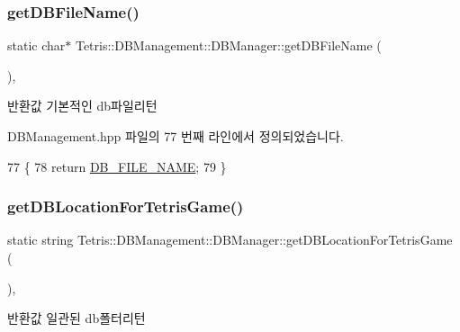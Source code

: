 \subsubsection{\texorpdfstring{get\+D\+B\+File\+Name()}{getDBFileName()}}
{\footnotesize\ttfamily static char$\ast$ Tetris\+::\+D\+B\+Management\+::\+D\+B\+Manager\+::get\+D\+B\+File\+Name (\begin{DoxyParamCaption}{ }\end{DoxyParamCaption})\hspace{0.3cm}{\ttfamily [inline]}, {\ttfamily [static]}}

\begin{DoxyReturn}{반환값}
기본적인 db파일리턴 
\end{DoxyReturn}


D\+B\+Management.\+hpp 파일의 77 번째 라인에서 정의되었습니다.


\begin{DoxyCode}
77                                         \{
78                 \textcolor{keywordflow}{return} \hyperlink{_base_d_b_management_8hpp_a028e4c5d141fe1c06da5636bbd2987ee}{DB\_FILE\_NAME};
79             \}
\end{DoxyCode}
\mbox{\label{class_tetris_1_1_d_b_management_1_1_d_b_manager_ae50cfd222e276a5ca27e17c886aa5dd5}} 
\subsubsection{\texorpdfstring{get\+D\+B\+Location\+For\+Tetris\+Game()}{getDBLocationForTetrisGame()}}
{\footnotesize\ttfamily static string Tetris\+::\+D\+B\+Management\+::\+D\+B\+Manager\+::get\+D\+B\+Location\+For\+Tetris\+Game (\begin{DoxyParamCaption}{ }\end{DoxyParamCaption})\hspace{0.3cm}{\ttfamily [inline]}, {\ttfamily [static]}}

\begin{DoxyReturn}{반환값}
일관된 db폴터리턴 
\end{DoxyReturn}


